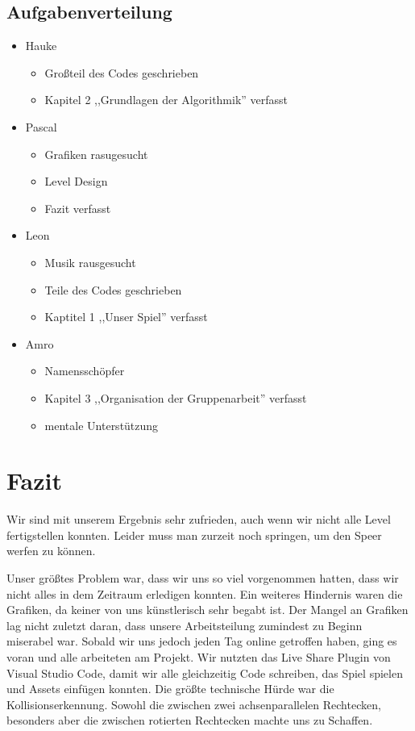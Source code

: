 \documentclass[12pt]{report}
\begin{document}
    \section{Aufgabenverteilung}
    \begin{itemize}
        \item Hauke
        \begin{itemize}
            \item Großteil des Codes geschrieben
            \item Kapitel 2 ,,Grundlagen der Algorithmik'' verfasst
        \end{itemize}
        \item Pascal
        \begin{itemize}
            \item Grafiken rasugesucht
            \item Level Design
            \item Fazit verfasst
        \end{itemize}
        \item Leon
        \begin{itemize}
            \item Musik rausgesucht
            \item Teile des Codes geschrieben
            \item Kaptitel 1 ,,Unser Spiel'' verfasst
        \end{itemize}
        \item Amro
        \begin{itemize}
            \item Namensschöpfer
            \item Kapitel 3 ,,Organisation der Gruppenarbeit'' verfasst
            \item mentale Unterstützung
        \end{itemize}
    \end{itemize}

    \chapter{Fazit}
    Wir sind mit unserem Ergebnis sehr zufrieden, auch wenn wir nicht alle
    Level fertigstellen konnten. Leider muss man zurzeit noch springen, um
    den Speer werfen zu können.
    
    Unser größtes Problem war, dass wir uns so viel
    vorgenommen hatten, dass wir nicht alles in dem Zeitraum erledigen konnten.
    Ein weiteres Hindernis waren die Grafiken, da keiner von uns künstlerisch
    sehr begabt ist. Der Mangel an Grafiken lag nicht zuletzt daran, dass unsere
    Arbeitsteilung zumindest zu Beginn miserabel war. Sobald wir uns jedoch
    jeden Tag online getroffen haben, ging es voran und alle arbeiteten am
    Projekt. Wir nutzten das Live Share Plugin von Visual Studio Code, damit wir
    alle gleichzeitig Code schreiben, das Spiel spielen und Assets einfügen konnten.
    Die größte technische Hürde war die Kollisionserkennung. Sowohl die zwischen zwei
    achsenparallelen Rechtecken, besonders aber die zwischen rotierten Rechtecken
    machte uns zu Schaffen.
\end{document}
